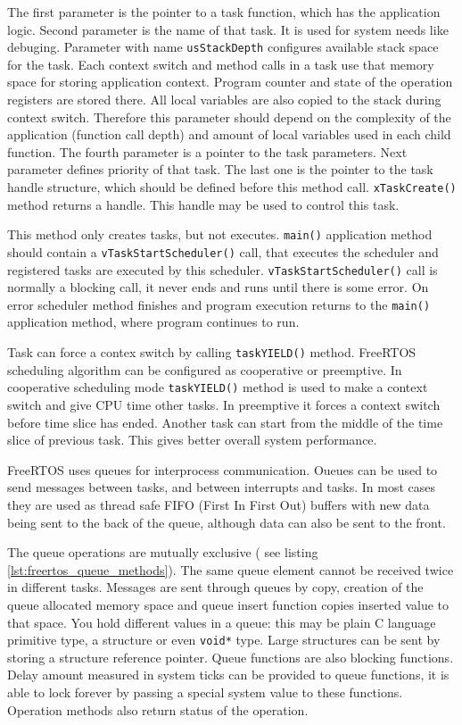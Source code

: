 The first parameter is the pointer to a task function, which has the application logic.
Second parameter is the name of that task. It is used for system needs like debuging.
Parameter with name \texttt{usStackDepth} configures available stack space for the task.
Each context switch and method calls in a task use that memory space for storing application context.
Program counter and state of the operation registers are stored there.
All local variables are also copied to the stack during context switch.
Therefore this parameter should depend on the complexity of the application (function call depth) and
amount of local variables used in each child function. 
The fourth parameter is a pointer to the task parameters. Next parameter defines priority of that task.
The last one is the pointer to the task handle structure, which should be defined before this method call.
\texttt{xTaskCreate()} method returns a handle.  This handle may be used to
control  this task.

This method only creates  tasks, but not executes. 
\texttt{main()} application method should contain a \texttt{vTaskStartScheduler()} call, that executes the scheduler and registered tasks are executed by this scheduler.
\texttt{vTaskStartScheduler()} call is normally a blocking call, it never ends and runs until there is some error.
On error scheduler method finishes and program execution returns to the
\texttt{main()} application method, where program continues to run.


Task can force a contex switch by calling \texttt{taskYIELD()} method.
FreeRTOS scheduling algorithm  can be configured as cooperative or preemptive.
In cooperative scheduling mode \texttt{taskYIELD()} method is used to make a
context switch and give CPU time other tasks.
In preemptive it forces a context switch before time slice has ended.
Another task can start from the middle of the time slice of previous task.
This gives better overall system performance.

FreeRTOS uses queues for interprocess communication.
Oueues can be used to send messages between tasks, and between interrupts and
tasks. 
In most cases they are used as thread safe FIFO (First In First Out) buffers with new data being sent to the back of the queue, although data can also be sent to the front. 

The queue operations are  mutually exclusive ( see listing
\autoref{lst:freertos_queue_methods}).
The same queue element cannot be received twice in different tasks.
Messages are sent through queues by copy, creation of the queue allocated memory
space and queue insert function copies inserted value to that space.
You hold different values in a queue: this may be plain C language primitive
type, a structure or even \texttt{void*} type. Large structures can be sent by
storing a structure reference pointer. 
Queue functions are also blocking functions. Delay amount measured in system
ticks can be provided to queue functions, it is able to lock forever by passing
a special system value to these functions. Operation methods also return status
of the operation.
 
